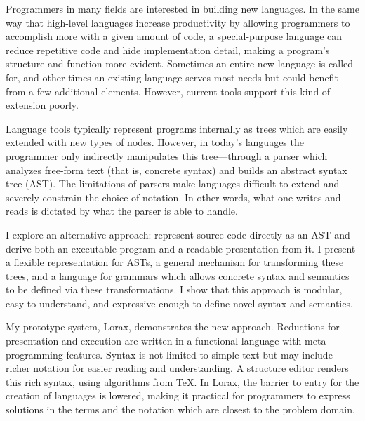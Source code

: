 Programmers in many fields are interested in building new languages. In the same way that high-level languages increase productivity by allowing programmers to accomplish more with a given amount of code, a special-purpose language can reduce repetitive code and hide implementation detail, making a program's structure and function more evident. Sometimes an entire new language is called for, and other times an existing language serves most needs but could benefit from a few additional elements. However, current tools support this kind of extension poorly.

Language tools typically represent programs internally as trees which are easily extended with new types of nodes. However, in today's languages the programmer only indirectly manipulates this tree---through a parser which analyzes free-form text (that is, concrete syntax) and builds an abstract syntax tree (AST). The limitations of parsers make languages difficult to extend and severely constrain the choice of notation. In other words, what one writes and reads is dictated by what the parser is able to handle.

I explore an alternative approach: represent source code directly as an AST and derive both an executable program and a readable presentation from it. I present a flexible representation for ASTs, a general mechanism for transforming these trees, and a language for grammars which allows concrete syntax and semantics to be defined via these transformations. I show that this approach is modular, easy to understand, and expressive enough to define novel syntax and semantics.

My prototype system, Lorax, demonstrates the new approach. Reductions for presentation and execution are written in a functional language with meta-programming features. Syntax is not limited to simple text but may include richer notation for easier reading and understanding. A structure editor renders this rich syntax, using algorithms from \TeX. In Lorax, the barrier to entry for the creation of languages is lowered, making it practical for programmers to express solutions in the terms and the notation which are closest to the problem domain.